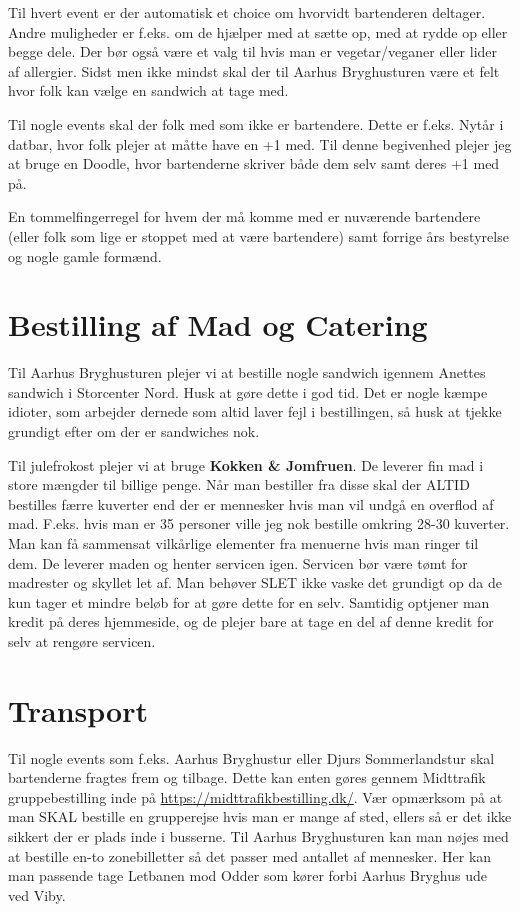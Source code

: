 Til hvert event er der automatisk et choice om hvorvidt bartenderen deltager. Andre muligheder er f.eks. om de hjælper med at sætte op, med at rydde op eller begge dele. Der bør også være et valg til hvis man er vegetar/veganer eller lider af allergier. Sidst men ikke mindst skal der til Aarhus Bryghusturen være et felt hvor folk kan vælge en sandwich at tage med.

Til nogle events skal der folk med som ikke er bartendere. Dette er f.eks. Nytår i datbar, hvor folk plejer at måtte have en +1 med. Til denne begivenhed plejer jeg at bruge en Doodle, hvor bartenderne skriver både dem selv samt deres +1 med på.

En tommelfingerregel for hvem der må komme med er nuværende bartendere (eller folk som lige er stoppet med at være bartendere) samt forrige års bestyrelse og nogle gamle formænd.

\section*{Bestilling af Mad og Catering}
Til Aarhus Bryghusturen plejer vi at bestille nogle sandwich igennem Anettes sandwich i Storcenter Nord. Husk at gøre dette i god tid. Det er nogle kæmpe idioter, som arbejder dernede som altid laver fejl i bestillingen, så husk at tjekke grundigt efter om der er sandwiches nok.

Til julefrokost plejer vi at bruge \textbf{Kokken \& Jomfruen}. De leverer fin mad i store mængder til billige penge. Når man bestiller fra disse skal der ALTID bestilles færre kuverter end der er mennesker hvis man vil undgå en overflod af mad. F.eks. hvis man er 35 personer ville jeg nok bestille omkring 28-30 kuverter. Man kan få sammensat vilkårlige elementer fra menuerne hvis man ringer til dem. De leverer maden og henter servicen igen. Servicen bør være tømt for madrester og skyllet let af. Man behøver SLET ikke vaske det grundigt op da de kun tager et mindre beløb for at gøre dette for en selv. Samtidig optjener man kredit på deres hjemmeside, og de plejer bare at tage en del af denne kredit for selv at rengøre servicen.

\section*{Transport}
Til nogle events som f.eks. Aarhus Bryghustur eller Djurs Sommerlandstur skal bartenderne fragtes frem og tilbage. Dette kan enten gøres gennem Midttrafik gruppebestilling inde på \url{https://midttrafikbestilling.dk/}. Vær opmærksom på at man SKAL bestille en grupperejse hvis man er mange af sted, ellers så er det ikke sikkert der er plads inde i busserne. Til Aarhus Bryghusturen kan man nøjes med at bestille en-to zonebilletter så det passer med antallet af mennesker. Her kan man passende tage Letbanen mod Odder som kører forbi Aarhus Bryghus ude ved Viby.

